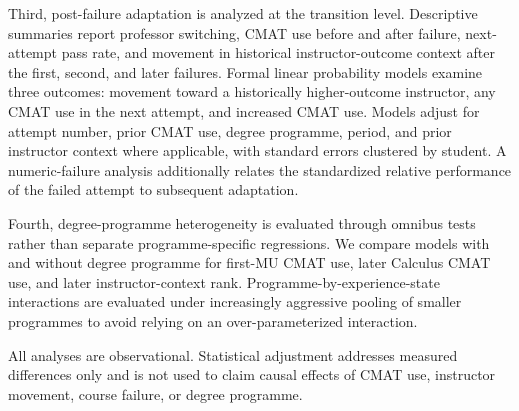 Third, post-failure adaptation is analyzed at the transition level. Descriptive summaries report professor switching, CMAT use before and after failure, next-attempt pass rate, and movement in historical instructor-outcome context after the first, second, and later failures. Formal linear probability models examine three outcomes: movement toward a historically higher-outcome instructor, any CMAT use in the next attempt, and increased CMAT use. Models adjust for attempt number, prior CMAT use, degree programme, period, and prior instructor context where applicable, with standard errors clustered by student. A numeric-failure analysis additionally relates the standardized relative performance of the failed attempt to subsequent adaptation.

Fourth, degree-programme heterogeneity is evaluated through omnibus tests rather than separate programme-specific regressions. We compare models with and without degree programme for first-MU CMAT use, later Calculus CMAT use, and later instructor-context rank. Programme-by-experience-state interactions are evaluated under increasingly aggressive pooling of smaller programmes to avoid relying on an over-parameterized interaction.

All analyses are observational. Statistical adjustment addresses measured differences only and is not used to claim causal effects of CMAT use, instructor movement, course failure, or degree programme.

